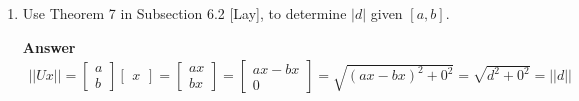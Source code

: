 \documentclass[10pt,a4paper]{article}
\theoremstyle{plain}
\theoremstyle{definition}
\begin{document}
\begin{enumerate}
  \item Use Theorem 7 in Subsection 6.2 [Lay], to determine \(|d|\)
  given \([a,b]\).
  \item[\textbf{Answer}] 
  \begin{align*}
    ||Ux|| = \begin{bmatrix}
      a \\ b
    \end{bmatrix}
    \begin{bmatrix}
      x
    \end{bmatrix}
    =
    \begin{bmatrix}
      ax \\ bx
    \end{bmatrix}
    =
    \begin{bmatrix}
      ax-bx \\ 0
    \end{bmatrix}
    =
    \sqrt{(ax-bx)^2+0^2}
    =
    \sqrt{d^2+0^2}
    =
    ||d||
  \end{align*}


\end{enumerate}
\end{document}
